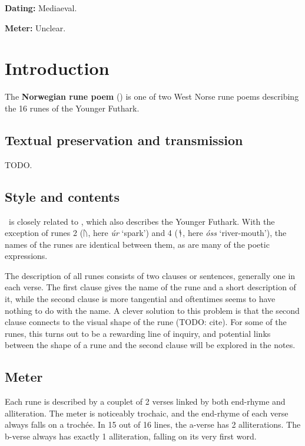 
\begin{flushright}%
\textbf{Dating:} Mediaeval.%

\textbf{Meter:} Unclear.
\end{flushright}%

\section{Introduction}

The \textbf{Norwegian rune poem} (\NorwegianRunePoem) is one of two West Norse rune poems describing the 16 runes of the Younger Futhark.

\subsection{Textual preservation and transmission}

TODO.

\subsection{Style and contents}

\NorwegianRunePoem\ is closely related to \IcelandicRunePoem, which also describes the Younger Futhark.  With the exception of runes 2 (ᚢ, here \emph{úr} ‘spark’) and 4 (ᚬ, here \emph{óss} ‘river-mouth’), the names of the runes are identical between them, as are many of the poetic expressions.

The description of all runes consists of two clauses or sentences, generally one in each verse.  The first clause gives the name of the rune and a short description of it, while the second clause is more tangential and oftentimes seems to have nothing to do with the name.  A clever solution to this problem is that the second clause connects to the visual shape of the rune (TODO: cite).  For some of the runes, this turns out to be a rewarding line of inquiry, and potential links between the shape of a rune and the second clause will be explored in the notes.

\subsection{Meter}

Each rune is described by a couplet of 2 verses linked by both end-rhyme and alliteration.  The meter is noticeably trochaic, and the end-rhyme of each verse always falls on a trochée.  In 15 out of 16 lines, the a-verse has 2 alliterations.  The b-verse always has exactly 1 alliteration, falling on its very first word.

